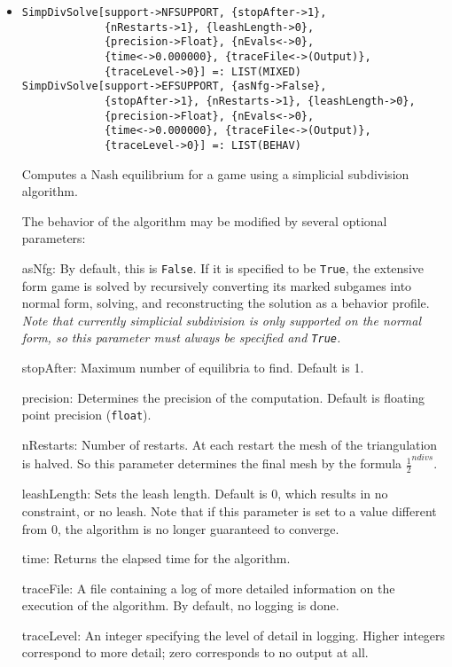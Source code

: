 \begin{itemize}
\item{}
\protect \large \begin{verbatim}
SimpDivSolve[support->NFSUPPORT, {stopAfter->1}, 
             {nRestarts->1}, {leashLength->0}, 
             {precision->Float}, {nEvals<->0}, 
             {time<->0.000000}, {traceFile<->(Output)}, 
             {traceLevel->0}] =: LIST(MIXED) 
SimpDivSolve[support->EFSUPPORT, {asNfg->False}, 
             {stopAfter->1}, {nRestarts->1}, {leashLength->0}, 
             {precision->Float}, {nEvals<->0}, 
             {time<->0.000000}, {traceFile<->(Output)}, 
             {traceLevel->0}] =: LIST(BEHAV) 
\end{verbatim}\normalsize

\bd
Computes a Nash equilibrium for a game using a simplicial subdivision
algorithm. 

The behavior of the algorithm may be modified by several optional
parameters:

\bd
\item
[asNfg:] By default, this is \verb+False+.  If it is specified to be
\verb+True+, the extensive form game is solved by recursively converting
its marked subgames into normal form, solving, and reconstructing the
solution as a behavior profile.  {\it Note that currently simplicial
subdivision is only supported on the normal form, so this parameter
must always be specified and {\tt True}.}
\item
[stopAfter:] Maximum number of equilibria to find. Default is 1.  
\item
[precision:] Determines the precision of the computation. Default is
floating point precision (\verb+float+). 
\item 
[nRestarts:] Number of restarts.  At each restart the mesh of the
triangulation is halved.  So this parameter determines the final mesh
by the formula $\frac{1}{2}^{ndivs}$.
\item
[leashLength:] Sets the leash length. Default is 0, which results in no
constraint, or no leash.  Note that if this parameter is set to a value
different from 0, the algorithm is no longer guaranteed to converge.
\item
[time:] Returns the elapsed time for the algorithm.
\item
[traceFile:] A file containing a log of more detailed information on the
execution of the algorithm.  By default, no logging is done.
\item
[traceLevel:] An integer specifying the level of detail in logging.
Higher integers correspond to more detail; zero corresponds to
no output at all.
\ed
\ed


\end{itemize}
